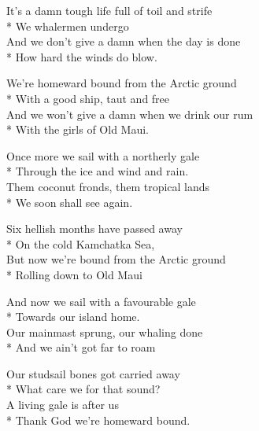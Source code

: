 
\contd
{}

\versemark
It’s a damn tough life full of toil and strife\\*
We whalermen undergo\\
And we don’t give a damn when the day is done\\*
How hard the winds do blow.

\contd
{}

We’re homeward bound from the Arctic ground\\*
With a good ship, taut and free\\
And we won’t give a damn when we drink our rum\\*
With the girls of Old Maui.

\contd
{}


\versemark
Once more we sail with a northerly gale\\*
Through the ice and wind and rain.\\
Them coconut fronds, them tropical lands\\*
We soon shall see again.

Six hellish months have passed away\\*
On the cold Kamchatka Sea,\\
But now we’re bound from the Arctic ground\\*
Rolling down to Old Maui 

\versemark
And now we sail with a favourable gale\\*
Towards our island home.\\
Our mainmast sprung, our whaling done\\*
And we ain’t got far to roam

Our studsail bones got carried away\\*
What care we for that sound?\\
A living gale is after us\\*
Thank God we’re homeward bound. 

